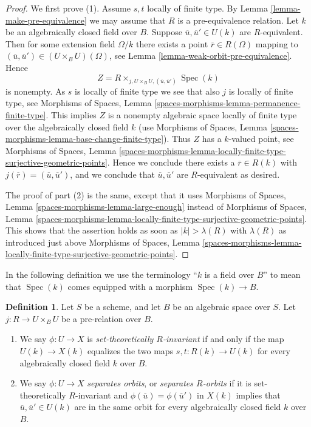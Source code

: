 \documentclass{stacks-project}
\theoremstyle{plain}
\theoremstyle{definition}
\newtheorem{definition}[subsection]{Definition}
\theoremstyle{remark}
\numberwithin{equation}{subsection}
\def\Spec{\mathop{\mathrm{Spec}}}
\begin{document}
\begin{proof}
We first prove (1). Assume $s, t$ locally of finite type. By
Lemma \ref{lemma-make-pre-equivalence}
we may assume that $R$ is a pre-equivalence relation.
Let $k$ be an algebraically closed field over $B$.
Suppose $\overline{u}, \overline{u}' \in U(k)$ are $R$-equivalent.
Then for some extension field $\Omega/k$ there exists
a point $\overline{r} \in R(\Omega)$ mapping to
$(\overline{u}, \overline{u}') \in (U \times_B U)(\Omega)$, see
Lemma \ref{lemma-weak-orbit-pre-equivalence}.
Hence
$$
Z = R \times_{j, U \times_B U, (\overline{u}, \overline{u}')} \Spec(k)
$$
is nonempty. As $s$ is locally of finite type we see that
also $j$ is locally of finite type, see
Morphisms of Spaces, Lemma \ref{spaces-morphisms-lemma-permanence-finite-type}.
This implies $Z$ is a nonempty algebraic space locally of finite type
over the algebraically closed field $k$ (use
Morphisms of Spaces,
Lemma \ref{spaces-morphisms-lemma-base-change-finite-type}).
Thus $Z$ has a $k$-valued point, see
Morphisms of Spaces, Lemma
\ref{spaces-morphisms-lemma-locally-finite-type-surjective-geometric-points}.
Hence we conclude there exists a $\overline{r} \in R(k)$ with
$j(\overline{r}) = (\overline{u}, \overline{u}')$, and we conclude that
$\overline{u}, \overline{u}'$ are $R$-equivalent as desired.

\medskip\noindent
The proof of part (2) is the same, except that it uses
Morphisms of Spaces, Lemma
\ref{spaces-morphisms-lemma-large-enough}
instead of
Morphisms of Spaces, Lemma
\ref{spaces-morphisms-lemma-locally-finite-type-surjective-geometric-points}.
This shows that the assertion holds as soon as $|k| > \lambda(R)$ with
$\lambda(R)$ as introduced just above
Morphisms of Spaces, Lemma
\ref{spaces-morphisms-lemma-locally-finite-type-surjective-geometric-points}.
\end{proof}

\noindent
In the following definition we use the terminology ``$k$ is a field
over $B$'' to mean that $\Spec(k)$ comes equipped with a morphism
$\Spec(k) \to B$.

\begin{definition}
\label{definition-set-theoretically-invariant}
Let $S$ be a scheme, and let $B$ be an algebraic space over $S$.
Let $j : R \to U \times_B U$ be a pre-relation over $B$.
\begin{enumerate}
\item We say $\phi : U \to X$ is {\it set-theoretically $R$-invariant}
if and only if the map $U(k) \to X(k)$ equalizes the two maps
$s, t : R(k) \to U(k)$ for every algebraically closed field $k$
over $B$.
\item We say $\phi : U \to X$ {\it separates orbits}, or
{\it separates $R$-orbits} if it is set-theoretically $R$-invariant and
$\phi(\overline{u}) = \phi(\overline{u}')$ in $X(k)$ implies that
$\overline{u}, \overline{u}' \in U(k)$ are in the same orbit
for every algebraically closed field $k$ over $B$.
\end{enumerate}
\end{definition}
\end{document}
